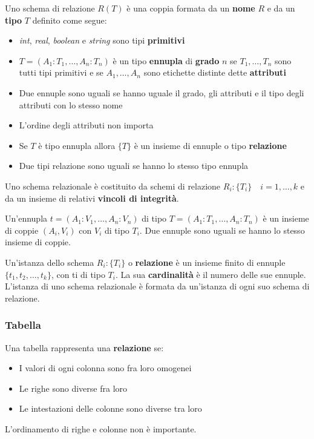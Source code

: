 \begin{definition}
	Uno schema di relazione $R(T)$ è una coppia formata da un \textbf{nome} $R$ e da un \textbf{tipo} $T$ definito come segue:
	\begin{itemize}
		\item \textit{int}, \textit{real}, \textit{boolean} e \textit{string} sono tipi \textbf{primitivi}
		\item $T=(A_1:T_1, \ldots, A_n:T_n)$ è un tipo \textbf{ennupla} di \textbf{grado} $n$ se $T_1, \ldots, T_n$ sono tutti tipi primitivi e se $A_1, \ldots, A_n$ sono etichette distinte dette \textbf{attributi}
		\item Due ennuple sono uguali se hanno uguale il grado, gli attributi e il tipo degli attributi con lo stesso nome
		\item L'ordine degli attributi non importa
		\item Se $T$ è tipo ennupla allora $\{T\}$ è un insieme di ennuple o tipo \textbf{relazione}
		\item Due tipi relazione sono uguali se hanno lo stesso tipo ennupla
	\end{itemize}
\end{definition}

\begin{definition}
	Uno schema relazionale è costituito da schemi di relazione $R_i:\{T_i\} \quad i=1, \ldots, k$ e da un insieme di relativi \textbf{vincoli di integrità}.
\end{definition}

\begin{definition}[Ennupla]
	Un'ennupla $t = (A_1:V_1, \ldots, A_n:V_n)$ di tipo $T=(A_1:T_1, \ldots, A_n:T_n)$ è un insieme di coppie $(A_i, V_i)$ con $V_i$ di tipo $T_i$. Due ennuple sono uguali se hanno lo stesso insieme di coppie.
\end{definition}

\begin{definition}[Istanza]
	Un’istanza dello schema $R_i : \{T_i\}$ o \textbf{relazione} è un insieme finito di ennuple $\{t_1, t_2 , \ldots, t_k\}$, con ti di tipo $T_i$. La sua \textbf{cardinalità} è il numero delle sue ennuple. L'istanza di uno schema relazionale è formata da un'istanza di ogni suo schema di relazione.
\end{definition}

\subsubsection{Tabella}
Una tabella rappresenta una \textbf{relazione} se:
\begin{itemize}
	\item I valori di ogni colonna sono fra loro omogenei
	\item Le righe sono diverse fra loro
	\item Le intestazioni delle colonne sono diverse tra loro
\end{itemize}
L'ordinamento di righe e colonne non è importante.

